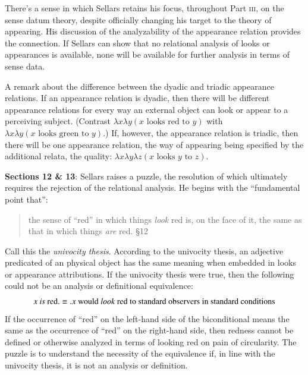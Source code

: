 \documentclass[11pt]{article}
\begin{document}
There's a sense in which Sellars retains his focus, throughout Part \textsc{iii}, on the sense datum theory, despite officially changing his target to the theory of appearing. His discussion of the analyzability of the appearance relation provides the connection. If Sellars can show that no relational analysis of looks or appearances is available, none will be available for further analysis in terms of sense data.

A remark about the difference between the dyadic and triadic appearance relations. If an appearance relation is dyadic, then there will be different appearance relations for every way an external object can look or appear to a perceiving subject. (Contrast \( \lambda x \lambda y (x \mbox{ looks red to } y) \) with \( \lambda x \lambda y (x \mbox{ looks green to } y) \).) If, however, the appearance relation is triadic, then there will be one appearance relation, the way of appearing being specified by the additional relata, the quality: \( \lambda x \lambda y \lambda z (x \mbox{ looks } y \mbox{ to } z) \).

\textbf{Sections 12 \& 13}: Sellars raises a puzzle, the resolution of which ultimately requires the rejection of the relational analysis. He begins with the ``fundamental point that'':
\begin{quote}
    the sense of ``red'' in which things \emph{look} red is, on the face of it, the same as that in which things \emph{are} red. §12
\end{quote} 
Call this the \emph{univocity thesis}. According to the univocity thesis, an adjective predicated of an physical object has the same meaning when embedded in looks or appearance attributions. If the univocity thesis were true, then the following could not be an analysis or definitional equivalence:
\[
    x \mbox{ \emph{is} red} . \equiv . x \mbox{ would \emph{look} red to standard observers in standard conditions}
\]
If the occurrence of ``red'' on the left-hand side of the biconditional means the same as the occurrence of ``red'' on the right-hand side, then redness cannot be defined or otherwise analyzed in terms of looking red on pain of circularity. The puzzle is to understand the necessity of the equivalence if, in line with the univocity thesis, it is not an analysis or definition.
\end{document}
